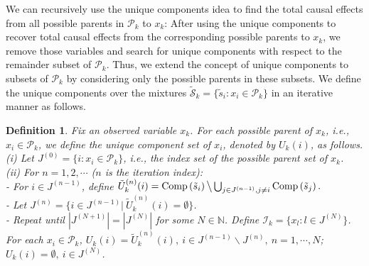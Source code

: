 \documentclass[12pt]{article}
\newtheorem{definition}{Definition}
\newcommand{\setS}{\mathcal{S}}
\begin{document}
We can recursively use the unique components idea to find the total causal effects from all possible parents in $\mathcal{P}_k$ to $x_k$: After using the unique components to recover total causal effects from the corresponding possible parents to $x_k$, we remove those variables and search for unique components with respect to the remainder subset of $\mathcal{P}_k$. Thus, we extend the concept of unique components to subsets of $\mathcal{P}_k$ by considering only the possible parents in these subsets. We define the unique components over the mixtures $\tilde{\setS}_k=\{\tilde{s}_i: x_i\in \mathcal{P}_k\}$ in an iterative manner as follows.
\begin{definition} \label{def:unique}
Fix an observed variable $x_k$. For each possible parent of $x_k$, i.e., $x_i\in\mathcal{P}_k$, we define the \emph{unique component set} of $x_i$, denoted by $U_k(i)$, as follows.\\
(i) Let $J^{(0)}=\{i: x_i\in \mathcal{P}_k \}$, i.e., the index set of the possible parent set of $x_k$.\\
(ii) For $n=1,2,\cdots$ ($n$ is the iteration index): \\
\hspace*{4pt} - For $i\in J^{(n-1)}$, define 
$\tilde{U}_{k}^{(n)}(i) = {\rm{Comp}}\left(\tilde{s}_{i}\right) \big\backslash \bigcup_{j \in J^{(n-1)}, j \neq i} {\rm{Comp}}\left(\tilde{s}_{j}\right).$ \\
\hspace*{4pt} - Let $J^{(n)} = \{i\in J^{(n-1)} |~ \tilde{U}^{(n)}_{k}(i)=\emptyset \}$. \\
\hspace*{4pt} - Repeat until $|J^{(N+1)}|=|J^{(N)}|$ for some $N\in\mathbb{N}$. Define $\mathcal{I}_k=\{x_l:  l\in J^{(N)}\}$.\\
For each $x_i\in \mathcal{P}_k$, $U_k(i) = \tilde{U}_{k}^{(n)}(i),~ i \in J^{(n-1)} \backslash J^{(n)},~n = 1,\cdots, N$; $U_k(i) = \emptyset,~i \in J^{(N)}$.
\end{definition}
\end{document}
